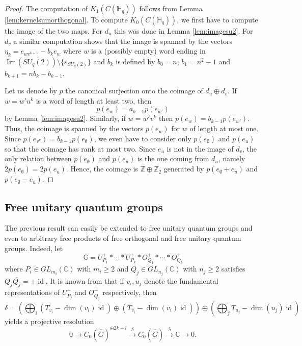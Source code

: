 \documentclass[a4paper, 11pt]{amsart}
\theoremstyle{plain}
\theoremstyle{definition}
\theoremstyle{remark}
\DeclareMathOperator{\id}{id}
\DeclareMathOperator{\Irr}{Irr}
\newcommand{\C}{\mathbb{C}}
\newcommand{\G}{\mathbb{G}}
\newcommand{\HH}{\mathbb{H}}
\newcommand{\Z}{\mathbb{Z}}
\begin{document}
\begin{proof}
The computation of $K_{1}(C(\HH_{q}))$ follows from Lemma \ref{lem:kernelsumorthogonal}. To compute $K_{0}(C(\HH_{q}))$, we first have to compute the image of the two maps. For $d_{u}$ this was done in Lemma \ref{lem:imagesu2}. For $d_{v}$ a similar computation shows that the image is spanned by the vectors $\eta_{k} = e_{wv^{k+1}} - b_{k}e_{w}$ where $w$ is a (possibly empty) word ending in $\Irr(SU_{q}(2))\setminus\{\varepsilon_{SU_{q}(2)}\}$ and $b_{k}$ is defined by $b_{0} = n$, $b_{1} = n^{2}-1$ and $b_{k+1} = nb_{k} - b_{k-1}$.

Let us denote by $p$ the canonical surjection onto the coimage of $d_{u}\oplus d_{v}$. If $w = w'u^{k}$ is a word of length at least two, then
\begin{equation*}
p(e_{w}) = a_{k-1}p(e_{w'})
\end{equation*}
by Lemma \ref{lem:imagesu2}. Similarly, if $w = w'v^{k}$ then $p(e_{w}) = b_{k-1}p(e_{w'})$. Thus, the coimage is spanned by the vectors $p(e_{w})$ for $w$ of length at most one. Since $p(e_{v^{k}}) = b_{k-1}p(e_{\emptyset})$, we even have to consider only $p(e_{\emptyset})$ and $p(e_{u})$ so that the coimage has rank at most two. Since $e_{u}$ is not in the image of $d_{v}$, the only relation between $p(e_{\emptyset})$ and $p(e_{u})$ is the one coming from $d_{u}$, namely $2p(e_{\emptyset}) = 2p(e_{u})$. Hence, the coimage is $\Z\oplus\Z_{2}$ generated by $p(e_{\emptyset} + e_{u})$ and $p(e_{\emptyset} - e_{u})$.
\end{proof}

\subsection{Free unitary quantum groups}

The previous result can easily be extended to free unitary quantum groups and even to arbitrary free products of free orthogonal and free unitary quantum groups. Indeed, let
\begin{equation*}
\G = U_{P_{1}}^{+}\ast\cdots\ast U_{P_{k}}^{+}\ast O_{Q_{1}}^{+}\ast\cdots\ast O_{Q_{l}}^{+}
\end{equation*}
where $P_{i}\in GL_{m_{i}}(\C)$ with $m_{i}\geqslant 2$ and $Q_{j}\in GL_{n_{j}}(\C)$ with $n_{j}\geqslant 2$ satisfies $Q_{j}\overline{Q_{j}} = \pm\id$. It is known from \cite{vergnioux2013k} that if $v_{i}, u_{j}$ denote the fundamental representations of $U_{P_{j}}^{+}$ and $O_{Q_{j}}^{+}$ respectively, then
\begin{equation*}
\delta = \left(\bigoplus_{i}(T_{v_{i}} - \dim(v_{i})\id)\oplus (T_{\overline{v}_{i}}-\dim(\overline{v}_{i})\id)\right)\oplus\left(\bigoplus_{j}T_{u_{j}} - \dim(u_{j})\id\right)
\end{equation*}
yields a projective resolution
\begin{equation*}
0 \longrightarrow C_{0}(\widehat{G})^{\oplus 2k+l} \overset{\delta}{\longrightarrow} C_{0}(\widehat{G}) \overset{\lambda}{\longrightarrow} \C \longrightarrow 0.
\end{equation*}
\end{document}
